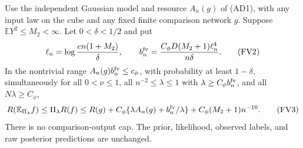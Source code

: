 \begin{theorem}
\label{thm:finite-variance-midpoint}
Use the independent Gaussian model and resource $A_n(g)$ of (AD1), with
any input law on the cube and any fixed finite comparison network $g$.
Suppose $\mathbb E Y^2\le M_2<\infty$. Let $0<\delta<1/2$ and put
\[
 \ell_n=\log\frac{e n(1+M_2)}\delta,
 \qquad
 b_n^{\rm fv}=\frac{C_\phi D(M_2+1)\ell_n^4}{n\delta}.  \tag{FV2}
\]
In the nontrivial range $A_n(g)b_n^{\rm fv}\le c_\phi$, with probability
at least $1-\delta$, simultaneously for all $0<\nu\le1$, all
$n^{-2}\le\lambda\le1$ with $\lambda\ge C_\phi b_n^{\rm fv}$,
and all $N\lambda\ge C_\phi$,
\[
 R(\mathbb E_{\Pi_\lambda}f)\le\Pi_\lambda R(f)
 \le R(g)+C_\phi\{\lambda A_n(g)+b_n^{\rm fv}/\lambda\}
       +C_\phi(M_2+1)n^{-10}.                         \tag{FV3}
\]
There is no comparison-output cap. The prior, likelihood, observed
labels, and raw posterior predictions are unchanged.
\end{theorem}
